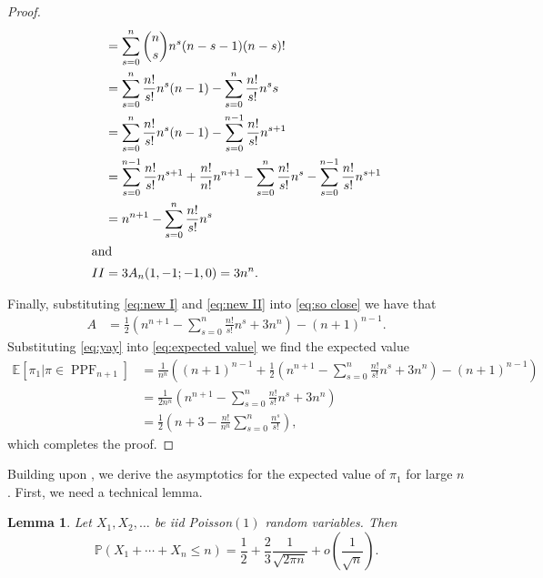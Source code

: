 \documentclass[12pt,reqno]{amsart}
\newtheorem{lemma}[theorem]{Lemma}
\theoremstyle{definition}
\newcommand{\E}{\mathbb{E}}
\theoremstyle{remark}
\DeclareMathOperator{\PPF}{PPF}
\newcommand{\PR}{\mathbb{P}}
\begin{document}
\begin{proof}
\begin{align}
    &=\sum_{s=0}^{n}\binom{n}{s}n^s(n-s-1)(n-s)!\nonumber\\
    &=\sum_{s=0}^n\frac{n!}{s!}n^s(n-1)-\sum_{s=0}^n\frac{n!}{s!}n^ss\nonumber\\
    &=\sum_{s=0}^n\frac{n!}{s!}n^{s}(n-1)-\sum_{s=0}^{n-1}\frac{n!}{s!}n^{s+1}\nonumber\\
    &=\sum_{s=0}^{n-1}\frac{n!}{s!}n^{s+1}+\frac{n!}{n!}n^{n+1}-\sum_{s=0}^n\frac{n!}{s!}n^{s}-\sum_{s=0}^{n-1}\frac{n!}{s!}n^{s+1}\nonumber\\
    &=n^{n+1}-\sum_{s=0}^n\frac{n!}{s!}n^{s}
    \label{eq:new I}\\
    \intertext{and}
II&=3A_n(1,-1;-1,0)=3n^n\label{eq:new II}.
\end{align}


Finally, substituting \eqref{eq:new I} and \eqref{eq:new II} into \eqref{eq:so close} we have that 
\begin{align}
    A&=\frac{1}{2}\left(n^{n+1}-\sum_{s=0}^n\frac{n!}{s!}n^{s}+3n^n\right)-(n+1)^{n-1}.\label{eq:yay}
\end{align}
Substituting \eqref{eq:yay} into \eqref{eq:expected value} we find the expected value
\begin{align*}
   \E[\pi_1 | \pi \in \PPF_{n+1}]%
    &=\frac{1}{n^n}\left((n+1)^{n-1}+\frac{1}{2}\left(n^{n+1}-\sum_{s=0}^n\frac{n!}{s!}n^{s}+3n^n\right)-(n+1)^{n-1}\right)\\
    &=\frac{1}{2n^n}\left(n^{n+1}-\sum_{s=0}^n\frac{n!}{s!}n^{s}+3n^n\right)\\
    &=\frac{1}{2}\left(n+3-\frac{n!}{n^n}\sum_{s=0}^n\frac{n^{s}}{s!}\right),
\end{align*}
which completes the proof.
\end{proof}

Building upon , we derive the asymptotics for the expected value of $\pi_1$ for large $n$. First, we need a technical lemma.
\begin{lemma} \cite[Lemma 21]{durmic2022probabilistic}\label{CLT}
 Let $X_1, X_2, \dots$ be iid Poisson$(1)$ random variables. Then
\begin{equation*}
\PR(X_1+\cdots+X_n \leq n)=\frac{1}{2}+\frac{2}{3}\frac{1}{\sqrt{2\pi n}}+o\left(\frac{1}{\sqrt{n}}\right).
\end{equation*}
\end{lemma}

\expectedvalueresultasymp*
\end{document}
